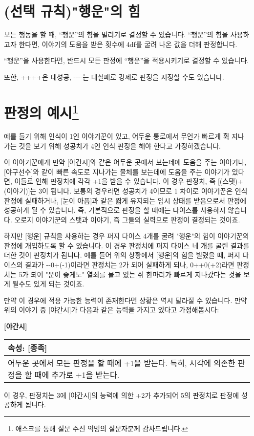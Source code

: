 \documentclass[12pt]{report}
\newenvironment{story}[2]
{\begin{center}
		{\large \textbf{[#1]}}\\[1ex]
		\begin{tabular}{|p{\textwidth}|}
			\hline
			\textbf{속성}: #2
			\\
			\hline
		}
		{ 
			\\\hline
		\end{tabular}
	\end{center}
}
\begin{document}
	\section*{(선택 규칙)"행운"의 힘}
	모든 행동을 할 때, “행운”의 힘을 빌리기로 결정할 수 있습니다. “행운”의 힘을 사용하고자 한다면, 이야기의 도움을 받은 횟수에 4df를 굴려 나온 값을 더해 판정합니다.
	
	“행운”을 사용한다면, 반드시 모든 판정에 “행운”을 적용시키기로 결정할 수 있습니다.
	
	또한, ++++은 대성공, -{}-{}-{}-는 대실패로 강제로 판정을 지정할 수도 있습니다.
	
	\section*{판정의 예시\footnote{애스크를 통해 질문 주신 익명의 질문자분께 감사드립니다.}}
	
	예를 들기 위해 인식이 1인 이야기꾼이 있고, 어두운 통로에서 무언가 빠르게 휙 지나가는 것을 보기 위해 성공치가 4인 인식 판정을 해야 한다고 가정하겠습니다.
	
	이 이야기꾼에게 만약 [야간시]와 같은 어두운 곳에서 보는데에 도움을 주는 이야기나, [야구선수]와 같이 빠른 속도로 지나가는 물체를 보는데에 도움을 주는 이야기가 있다면, 이들로 인해 판정치에 각각 +1을 받을 수 있습니다. 이 경우 판정치, 즉 [(스탯)+(이야기)]는 3이 됩니다. 보통의 경우라면 성공치가 4이므로 1 차이로 이야기꾼은 인식 판정에 실패하거나, [눈이 아픔]과 같은 짧게 유지되는 임시 상태를 받음으로서 판정에 성공하게 될 수 있습니다. 즉, 기본적으로 판정을 할 때에는 다이스를 사용하지 않습니다. 오로지 이야기꾼의 스탯과 이야기, 즉 그들의 실력으로 판정이 결정되는 것이죠.
	
	하지만 [행운] 규칙을 사용하는 경우 퍼지 다이스 4개를 굴려 "행운"의 힘이 이야기꾼의 판정에 개입하도록 할 수 있습니다. 이 경우 판정치에 퍼지 다이스 네 개를 굴린 결과를 더한 것이 판정치가 됩니다. 예를 들어 위의 상황에서 [행운]의 힘을 빌렸을 때, 퍼지 다이스의 결과가 -{}-0+(-1)이라면 판정치는 2가 되어 실패하게 되나, 0++0(+2)라면 판정치는 5가 되어 "운이 좋게도" 열쇠를 물고 있는 쥐 한마리가 빠르게 지나갔다는 것을 보게 될수도 있게 되는 것이죠.
	
	만약 이 경우에 적용 가능한 능력이 존재한다면 상황은 역시 달라질 수 있습니다. 만약 위의 이야기 중 [야간시]가 다음과 같은 능력을 가지고 있다고 가정해봅시다:
	\begin{story}{야간시}{[종족]}
		어두운 곳에서 모든 판정을 할 때에 +1을 받는다. 특히, 시각에 의존한 판정을 할 때에 추가로 +1을 받는다.
	\end{story}
	이 경우, 판정치는 3에 [야간시]의 능력에 의한 +2가 추가되어 5의 판정치로 판정에 성공하게 됩니다.
	
\end{document}
